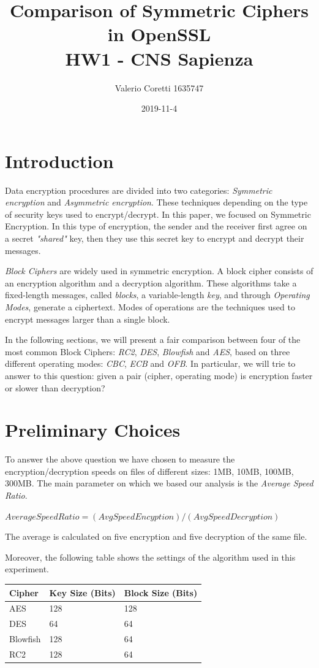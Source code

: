 \documentclass[11pt]{article}
\title{{\bf Comparison of Symmetric Ciphers in OpenSSL} \\ \bigskip \large HW1 - CNS Sapienza}
\date{2019-11-4}
\author{Valerio Coretti 1635747}
\begin{document}
\maketitle

\section{Introduction}
Data encryption procedures are divided into two categories: {\em Symmetric encryption} and {\em Asymmetric encryption}. These techniques depending on the type of security keys used to encrypt/decrypt. In this paper, we focused on Symmetric Encryption. In this type of encryption, 
the sender and the receiver first agree on a secret {\em "shared"} key, then they use this secret key to encrypt and decrypt their messages.

{\em Block Ciphers} are widely used in symmetric encryption. A block cipher consists of an encryption algorithm and a decryption algorithm. 
These algorithms take a fixed-length messages, called {\em blocks}, a variable-length {\em key}, and through {\em Operating Modes}, generate
a ciphertext. Modes of operations are the techniques used to encrypt messages larger than a single block.

In the following sections, we will present a fair comparison between four of the most common Block Ciphers: 
{\em RC2}, {\em DES}, {\em Blowfish} and {\em AES}, based on three different operating modes: {\em CBC}, {\em ECB} and {\em OFB}.
In particular, we will trie to answer to this question: given a pair (cipher, operating mode) is encryption faster or slower than decryption?

\section{Preliminary Choices}
To answer the above question we have chosen to measure the encryption/decryption speeds on files of different sizes: 1MB, 10MB, 100MB, 300MB.
The main parameter on which we based our analysis is the {\em Average Speed Ratio}.

$ Average Speed Ratio = (AvgSpeedEncyption)/(AvgSpeedDecryption) $

The average is calculated on five encryption and five decryption of the same file.

Moreover, the following table shows the settings of the algorithm used in this experiment.

\bigskip
\begin{tabular}{ | l | l | l | }
        \hline
        \textbf{Cipher} & \textbf{Key Size (Bits)} & \textbf{Block Size (Bits)} \\ \hline
    AES & 128 & 128  \\ \hline
    DES & 64 & 64 \\ \hline
    Blowfish & 128 & 64 \\ \hline
    RC2 & 128 & 64 \\ \hline
\end{tabular}
\bigskip
\end{document}
